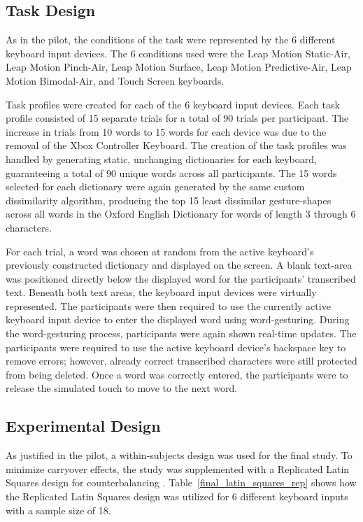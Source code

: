 \subsection{Task Design} \label{final_task_design}
As in the pilot, the conditions of the task were represented by the 6 different keyboard input devices. The 6 conditions used were the Leap Motion Static-Air, Leap Motion Pinch-Air, Leap Motion Surface, Leap Motion Predictive-Air, Leap Motion Bimodal-Air, and Touch Screen keyboards.

Task profiles were created for each of the 6 keyboard input devices. Each task profile consisted of 15 separate trials for a total of 90 trials per participant. The increase in trials from 10 words to 15 words for each device was due to the removal of the Xbox Controller Keyboard. The creation of the task profiles was handled by generating static, unchanging dictionaries for each keyboard, guaranteeing a total of 90 unique words across all participants. The 15 words selected for each dictionary were again generated by the same custom dissimilarity algorithm, producing the top 15 least dissimilar gesture-shapes across all words in the Oxford English Dictionary for words of length 3 through 6 characters.

For each trial, a word was chosen at random from the active keyboard's previously constructed dictionary and displayed on the screen. A blank text-area was positioned directly below the displayed word for the participants' transcribed text. Beneath both text areas, the keyboard input devices were virtually represented. The participants were then required to use the currently active keyboard input device to enter the displayed word using word-gesturing. During the word-gesturing process, participants were again shown real-time updates. The participants were required to use the active keyboard device's backspace key to remove errors; however, already correct transcribed characters were still protected from being deleted. Once a word was correctly entered, the participants were to release the simulated touch to move to the next word.

\subsection{Experimental Design} \label{final_experimental_design}
As justified in the pilot, a within-subjects design was used for the final study. To minimize carryover effects, the study was supplemented with a Replicated Latin Squares design for counterbalancing \cite{ref_replicated_latin_squares}. Table~\ref{final_latin_squares_rep} shows how the Replicated Latin Squares design was utilized for 6 different keyboard inputs with a sample size of 18.

